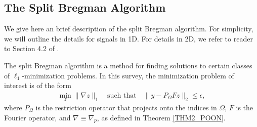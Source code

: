\documentclass[11pt, oneside]{article}   %
\newcommand{\norm}[1]{\lVert #1 \rVert}
\begin{document}
%
% 
\begin{appendices}
\section{The Split Bregman Algorithm}\label{sb append}
We give here an brief description of the split Bregman algorithm. For simplicity, we will outline the details for signals in 1D. For details in 2D, we refer to reader to Section 4.2 of \cite{goldstein2009split}.

The split Bregman algorithm is a method for finding solutions to certain classes of $\ell_1$-minimization problems. In this survey, the minimization problem of interest is of the form 
\begin{align}
	\min_z \norm{\nabla z}_1 \quad\text{such that} \quad \norm{y - P_\Omega Fz}_2 \leq \epsilon,
	\label{sb1}
\end{align}
where $P_\Omega$ is the restriction operator that projects onto the indices in $\Omega$, $F$ is the Fourier operator, and $\nabla \equiv \nabla_p$, as defined in Theorem \ref{THM2_POON}.


\end{appendices}
\end{document}
